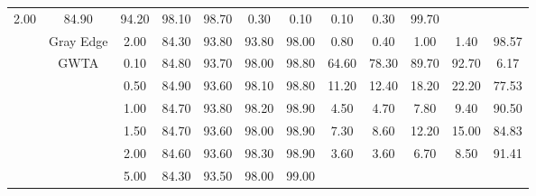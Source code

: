 \begin{table}[htbp]
{\begin{tabular}{cc|c|ccccccccc}
  2.00 &
  \multicolumn{1}{c|}{84.90} &
  \multicolumn{1}{c|}{94.20} &
  \multicolumn{1}{c|}{98.10} &
  \multicolumn{1}{c|}{98.70} &
  \multicolumn{1}{c|}{0.30} &
  \multicolumn{1}{c|}{0.10} &
  \multicolumn{1}{c|}{0.10} &
  \multicolumn{1}{c|}{0.30} &
  99.70 \\ \cline{2-12} 
\multicolumn{1}{c|}{} &
  Gray Edge &
  2.00 &
  \multicolumn{1}{c|}{84.30} &
  \multicolumn{1}{c|}{93.80} &
  \multicolumn{1}{c|}{93.80} &
  \multicolumn{1}{c|}{98.00} &
  \multicolumn{1}{c|}{0.80} &
  \multicolumn{1}{c|}{0.40} &
  \multicolumn{1}{c|}{1.00} &
  \multicolumn{1}{c|}{1.40} &
  98.57 \\ \cline{2-12} 
\multicolumn{1}{c|}{} &
  \multirow{9}{*}{GWTA}&
  0.10 &
  \multicolumn{1}{c|}{84.80} &
  \multicolumn{1}{c|}{93.70} &
  \multicolumn{1}{c|}{98.00} &
  \multicolumn{1}{c|}{98.80} &
  \multicolumn{1}{c|}{64.60} &
  \multicolumn{1}{c|}{78.30} &
  \multicolumn{1}{c|}{89.70} &
  \multicolumn{1}{c|}{92.70} &
  6.17 \\ \cline{3-12} 
\multicolumn{1}{c|}{} &
   &
  0.50 &
  \multicolumn{1}{c|}{84.90} &
  \multicolumn{1}{c|}{93.60} &
  \multicolumn{1}{c|}{98.10} &
  \multicolumn{1}{c|}{98.80} &
  \multicolumn{1}{c|}{11.20} &
  \multicolumn{1}{c|}{12.40} &
  \multicolumn{1}{c|}{18.20} &
  \multicolumn{1}{c|}{22.20} &
  77.53 \\ \cline{3-12} 
\multicolumn{1}{c|}{} &
   &
  1.00 &
  \multicolumn{1}{c|}{84.70} &
  \multicolumn{1}{c|}{93.80} &
  \multicolumn{1}{c|}{98.20} &
  \multicolumn{1}{c|}{98.90} &
  \multicolumn{1}{c|}{4.50} &
  \multicolumn{1}{c|}{4.70} &
  \multicolumn{1}{c|}{7.80} &
  \multicolumn{1}{c|}{9.40} &
  90.50 \\ \cline{3-12} 
\multicolumn{1}{c|}{} &
   &
  1.50 &
  \multicolumn{1}{c|}{84.70} &
  \multicolumn{1}{c|}{93.60} &
  \multicolumn{1}{c|}{98.00} &
  \multicolumn{1}{c|}{98.90} &
  \multicolumn{1}{c|}{7.30} &
  \multicolumn{1}{c|}{8.60} &
  \multicolumn{1}{c|}{12.20} &
  \multicolumn{1}{c|}{15.00} &
  84.83 \\ \cline{3-12} 
\multicolumn{1}{c|}{} &
   &
  2.00 &
  \multicolumn{1}{c|}{84.60} &
  \multicolumn{1}{c|}{93.60} &
  \multicolumn{1}{c|}{98.30} &
  \multicolumn{1}{c|}{98.90} &
  \multicolumn{1}{c|}{3.60} &
  \multicolumn{1}{c|}{3.60} &
  \multicolumn{1}{c|}{6.70} &
  \multicolumn{1}{c|}{8.50} &
  91.41 \\ \cline{3-12} 
\multicolumn{1}{c|}{} &
   &
  5.00 &
  \multicolumn{1}{c|}{84.30} &
  \multicolumn{1}{c|}{93.50} &
  \multicolumn{1}{c|}{98.00} &
  \multicolumn{1}{c|}{99.00} &

\end{tabular}}
\end{table}
